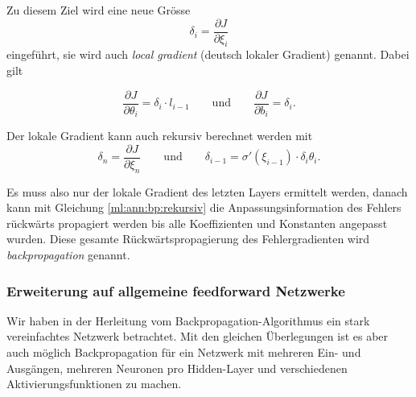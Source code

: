 Zu diesem Ziel wird eine neue Grösse 
\begin{equation}
    \delta_i = \frac{\partial J}{\partial \xi_i}
\end{equation}
eingeführt, sie wird auch \emph{local gradient} (deutsch lokaler Gradient) genannt. Dabei
gilt

\begin{equation}
    \frac{\partial J}{\partial \theta_i} = \delta_i \cdot l_{i-1}
    \qquad\text{und}\qquad
    \frac{\partial J}{\partial b_i} = \delta_i.
\end{equation}

Der lokale Gradient kann auch rekursiv berechnet werden mit
\begin{equation}
    \delta_n = \frac{\partial J}{\partial \xi_n}
    \qquad\text{und}\qquad
    \delta_{i-1} = \sigma'(\xi_{i-1}) \cdot \delta_i \theta_i.
    \label{ml:ann:bp:rekursiv}
\end{equation}

Es muss also nur der lokale Gradient des letzten Layers ermittelt werden, danach kann mit
Gleichung \ref{ml:ann:bp:rekursiv} die Anpassungsinformation des Fehlers rückwärts
propagiert werden bis alle Koeffizienten und Konstanten angepasst wurden. Diese gesamte
Rückwärtspropagierung des Fehlergradienten wird \emph{backpropagation} genannt.

\subsubsection{Erweiterung auf allgemeine feedforward Netzwerke}

Wir haben in der Herleitung vom Backpropagation-Algorithmus ein stark vereinfachtes
Netzwerk betrachtet. Mit den gleichen Überlegungen ist es aber auch möglich
Backpropagation für ein Netzwerk mit mehreren Ein- und Ausgängen, mehreren Neuronen pro
Hidden-Layer und verschiedenen Aktivierungsfunktionen zu machen.

